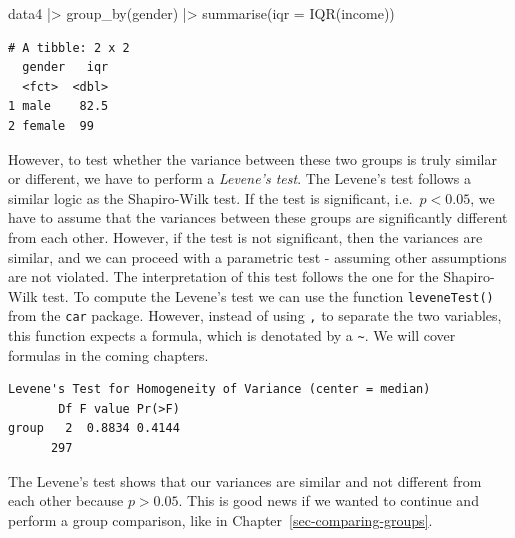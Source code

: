 \documentclass[
  letterpaper,
]{krantz}
\makeatletter
\newenvironment{Shaded}{\begin{snugshade}}{\end{snugshade}}
\newcommand{\AttributeTok}[1]{\textcolor[rgb]{0.40,0.45,0.13}{#1}}
\newcommand{\FunctionTok}[1]{\textcolor[rgb]{0.28,0.35,0.67}{#1}}
\newcommand{\NormalTok}[1]{\textcolor[rgb]{0.00,0.23,0.31}{#1}}
\newcommand{\SpecialCharTok}[1]{\textcolor[rgb]{0.37,0.37,0.37}{#1}}
\newenvironment{kframe}{%
\medskip{}
\setlength{\fboxsep}{.8em}
 \def\at@end@of@kframe{}%
 \ifinner\ifhmode%
  \def\at@end@of@kframe{\end{minipage}}%
  \begin{minipage}{\columnwidth}%
 \fi\fi%
 \def\FrameCommand##1{\hskip\@totalleftmargin \hskip-\fboxsep
 \colorbox{shadecolor}{##1}\hskip-\fboxsep
     \hskip-\linewidth \hskip-\@totalleftmargin \hskip\columnwidth}%
 \MakeFramed {\advance\hsize-\width
   \@totalleftmargin\z@ \linewidth\hsize
   \@setminipage}}%
 {\par\unskip\endMakeFramed%
 \at@end@of@kframe}
\renewenvironment{Shaded}{\begin{kframe}}{\end{kframe}}
\makeatother
\begin{document}
\begin{Shaded}
\begin{Highlighting}[]
\NormalTok{data4 }\SpecialCharTok{|\textgreater{}}
  \FunctionTok{group\_by}\NormalTok{(gender) }\SpecialCharTok{|\textgreater{}}
  \FunctionTok{summarise}\NormalTok{(}\AttributeTok{iqr =} \FunctionTok{IQR}\NormalTok{(income))}
\end{Highlighting}
\end{Shaded}

\begin{verbatim}
# A tibble: 2 x 2
  gender   iqr
  <fct>  <dbl>
1 male    82.5
2 female  99  
\end{verbatim}

However, to test whether the variance between these two groups is truly
similar or different, we have to perform a \emph{Levene's test}. The
Levene's test follows a similar logic as the Shapiro-Wilk test. If the
test is significant, i.e.~\(p < 0.05\), we have to assume that the
variances between these groups are significantly different from each
other. However, if the test is not significant, then the variances are
similar, and we can proceed with a parametric test - assuming other
assumptions are not violated. The interpretation of this test follows
the one for the Shapiro-Wilk test. To compute the Levene's test we can
use the function \texttt{leveneTest()} from the \texttt{car} package.
However, instead of using \texttt{,} to separate the two variables, this
function expects a formula, which is denotated by a
\texttt{\textasciitilde{}}. We will cover formulas in the coming
chapters.

\begin{Shaded}
\end{Shaded}

\begin{verbatim}
Levene's Test for Homogeneity of Variance (center = median)
       Df F value Pr(>F)
group   2  0.8834 0.4144
      297               
\end{verbatim}

The Levene's test shows that our variances are similar and not different
from each other because \(p > 0.05\). This is good news if we wanted to
continue and perform a group comparison, like in
Chapter~\ref{sec-comparing-groups}.
\end{document}
